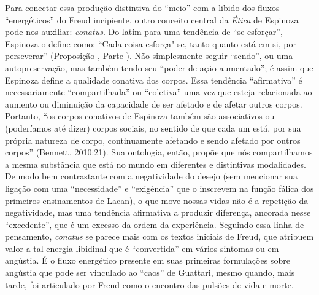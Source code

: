 Para conectar essa produção distintiva do ``meio'' com a libido dos
fluxos ``energéticos'' do Freud incipiente, outro conceito central da
\emph{Ética} de Espinoza pode nos auxiliar: \emph{conatus}. Do latim
para uma tendência de ``se esforçar'', Espinoza o define como: ``Cada
coisa esforça"-se, tanto quanto está em si, por perseverar'' (Proposição
, Parte ). Não simplesmente seguir ``sendo'', ou uma
autopreservação, mas também tendo seu ``poder de ação aumentado''; é
assim que Espinoza define a qualidade conativa dos corpos. Essa
tendência ``afirmativa'' é necessariamente ``compartilhada'' ou
``coletiva'' uma vez que esteja relacionada ao aumento ou diminuição da
capacidade de ser afetado e de afetar outros corpos. Portanto, ``os
corpos conativos de Espinoza também são associativos ou (poderíamos até
dizer) corpos sociais, no sentido de que cada um está, por sua própria
natureza de corpo, continuamente afetando e sendo afetado por outros
corpos'' (Bennett, 2010:21). Sua ontologia, então, propõe que nós
compartilhamos a mesma substância que está no mundo em diferentes e
distintivas modalidades. De modo bem contrastante com a negatividade do
desejo (sem mencionar sua ligação com uma ``necessidade'' e
``exigência'' que o inscrevem na função fálica dos primeiros
ensinamentos de Lacan), o que move nossas vidas não é a repetição da
negatividade, mas uma tendência afirmativa a produzir diferença,
ancorada nesse ``excedente'', que é um excesso da ordem da experiência.
Seguindo essa linha de pensamento, \emph{conatus} se parece mais com os
textos iniciais de Freud, que atribuem valor a tal energia libidinal que
é ``convertida'' em vários sintomas ou em angústia. É o fluxo energético
presente em suas primeiras formulações sobre angústia que pode ser
vinculado ao ``caos'' de Guattari, mesmo quando, mais tarde, foi
articulado por Freud como o encontro das pulsões de vida e morte.


